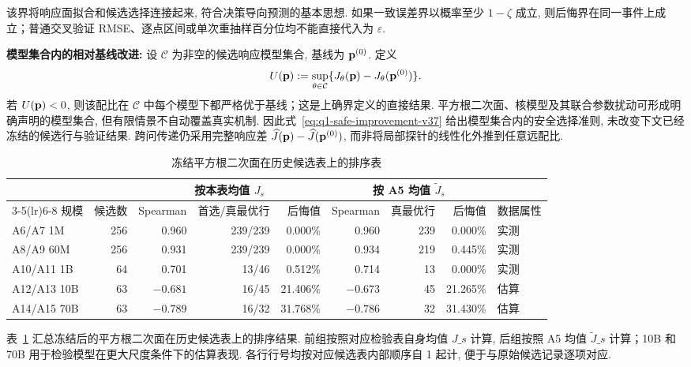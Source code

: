 该界将响应面拟合和候选选择连接起来, 符合决策导向预测的基本思想\cite{elmachtoub_spo}. 如果一致误差界以概率至少 $1-\zeta$ 成立, 则后悔界在同一事件上成立；普通交叉验证 RMSE、逐点区间或单次重抽样百分位均不能直接代入为 $\varepsilon$. 

\textbf{模型集合内的相对基线改进:}
设 $\mathcal C$ 为非空的候选响应模型集合, 基线为 $\mathbf p^{(0)}$. 定义
\begin{equation}\label{eq:q1-safe-improvement-v37}
U(\mathbf p):=\sup_{\theta\in\mathcal C}
\{J_\theta(\mathbf p)-J_\theta(\mathbf p^{(0)})\}.
\end{equation}
若 $U(\mathbf p)<0$, 则该配比在 $\mathcal C$ 中每个模型下都严格优于基线；这是上确界定义的直接结果. 
平方根二次面、核模型及其联合参数扰动可形成明确声明的模型集合, 但有限情景不自动覆盖真实机制. 因此式~\eqref{eq:q1-safe-improvement-v37} 给出模型集合内的安全选择准则, 未改变下文已经冻结的候选行与验证结果. 跨问传递仍采用完整响应差 $\widehat J(\mathbf p)-\widehat J(\mathbf p^{(0)})$, 而非将局部探针的线性化外推到任意远配比. 


\begin{table}[H]\centering\scriptsize
\setlength{\tabcolsep}{2.5pt}
\caption{冻结平方根二次面在历史候选表上的排序表}\label{tab:scale}
\begin{tabular}{lrrrrrrrl}\toprule
& & \multicolumn{3}{c}{按本表均值 $J_s$} & \multicolumn{3}{c}{按 A5 均值 $\widetilde J_s$} &\\
\cmidrule(lr){3-5}\cmidrule(lr){6-8}
规模 & 候选数 & Spearman & 首选/真最优行 & 后悔值 & Spearman & 真最优行 & 后悔值 & 数据属性\\\midrule
A6/A7 1M & 256 & 0.960 & 239/239 & 0.000\% & 0.960 & 239 & 0.000\% & 实测\\
A8/A9 60M & 256 & 0.931 & 239/239 & 0.000\% & 0.934 & 219 & 0.445\% & 实测\\
A10/A11 1B & 64 & 0.701 & 13/46 & 0.512\% & 0.714 & 13 & 0.000\% & 实测\\
A12/A13 10B & 63 & $-0.681$ & 16/45 & 21.406\% & $-0.673$ & 45 & 21.265\% & 估算\\
A14/A15 70B & 63 & $-0.789$ & 16/32 & 31.768\% & $-0.786$ & 32 & 31.430\% & 估算\\\bottomrule
\end{tabular}
\end{table}

表~\ref{tab:scale} 汇总冻结后的平方根二次面在历史候选表上的排序结果. 前组按照对应检验表自身均值 $J\_s$ 计算,  后组按照 A5 均值 $\tilde{J}\_s$ 计算；10B 和 70B 用于检验模型在更大尺度条件下的估算表现. 各行行号均按对应候选表内部顺序自 1 起计,  便于与原始候选记录逐项对应.

